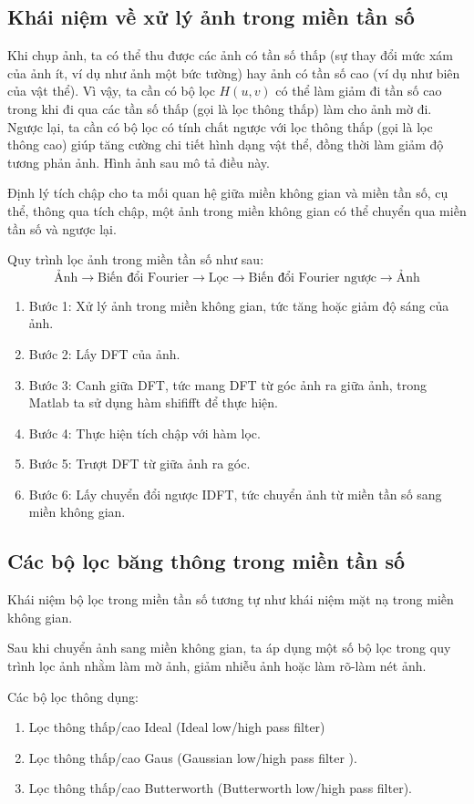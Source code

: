 \documentclass[12pt,a4paper]{report}
\numberwithin{equation}{section}
\theoremstyle{definition} %
\begin{document}
\subsection{Khái niệm về xử lý ảnh trong miền tần số}
Khi chụp ảnh, ta có thể thu được các ảnh có tần số thấp (sự thay đổi mức xám của ảnh ít, ví dụ như ảnh một bức tường) hay ảnh có tần số cao (ví dụ như biên của vật thể). Vì vậy, ta cần có bộ lọc $H(u,v)$ có thể làm giảm đi tần số cao trong khi đi qua các tần số thấp (gọi là lọc thông thấp) làm cho ảnh mờ đi. Ngược lại, ta cần có bộ lọc có tính chất ngược với lọc thông thấp (gọi là lọc thông cao) giúp tăng cường chi tiết hình dạng vật thể, đồng thời làm giảm độ tương phản ảnh. Hình ảnh sau mô tả điều này.



Định lý tích chập cho ta mối quan hệ giữa miền không gian và miền tần số, cụ thể, thông qua tích chập, một ảnh trong miền không gian có thể chuyển qua miền tần số và ngược lại.

Quy trình lọc ảnh trong miền tần số như sau:
\[\text{Ảnh}\rightarrow\text{Biến đổi Fourier}\rightarrow\text{Lọc}\rightarrow\text{Biến đổi Fourier ngược}
\rightarrow\text{Ảnh}\]
\begin{enumerate}
\item Bước 1: Xử lý ảnh trong miền không gian, tức tăng hoặc giảm độ sáng của ảnh.
\item Bước 2: Lấy DFT của ảnh.
\item Bước 3: Canh giữa DFT, tức mang DFT từ góc ảnh ra giữa ảnh, trong Matlab ta sử dụng hàm shififft để thực hiện.
\item Bước 4: Thực hiện tích chập với hàm lọc.
\item Bước 5: Trượt DFT từ giữa ảnh ra góc.
\item Bước 6: Lấy chuyển đổi ngược IDFT, tức chuyển ảnh từ miền tần số sang miền không gian.
\end{enumerate}
\subsection{Các bộ lọc băng thông trong miền tần số}

Khái niệm bộ lọc trong miền tần số tương tự như khái niệm mặt nạ trong miền không gian.

Sau khi chuyển ảnh sang miền không gian, ta áp dụng một số bộ lọc trong quy trình lọc ảnh nhằm làm mờ ảnh, giảm nhiễu ảnh hoặc làm rõ-làm nét ảnh.

Các bộ lọc thông dụng:
\begin{enumerate}
\item Lọc thông thấp/cao Ideal (Ideal low/high pass filter)
\item Lọc thông thấp/cao Gaus (Gaussian low/high pass filter
).

\item Lọc thông thấp/cao Butterworth (Butterworth low/high pass filter).



\end{enumerate}
\end{document}
